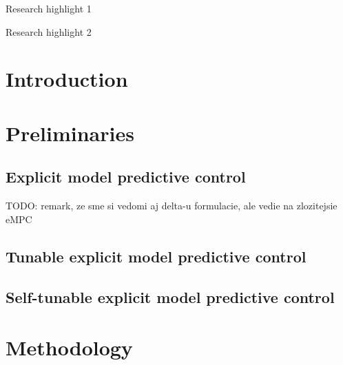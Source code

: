 \documentclass[preprint,12pt]{elsarticle}
\begin{document}
\begin{frontmatter}
\begin{highlights}
\item Research highlight 1
\item Research highlight 2
\end{highlights}

\begin{keyword}



\end{keyword}

\end{frontmatter}


\section{Introduction}
\label{sec:introduction}


\section{Preliminaries}
\label{sec:preliminaries}

\subsection{Explicit model predictive control}
\label{sec:eMPC}
TODO: remark, ze sme si vedomi aj delta-u formulacie, ale vedie na zlozitejsie eMPC

\subsection{Tunable explicit model predictive control}
\label{sec:tunable}

\subsection{Self-tunable explicit model predictive control}
\label{sec:self_tunable}


\section{Methodology}
\label{sec:methodology}
\end{document}
